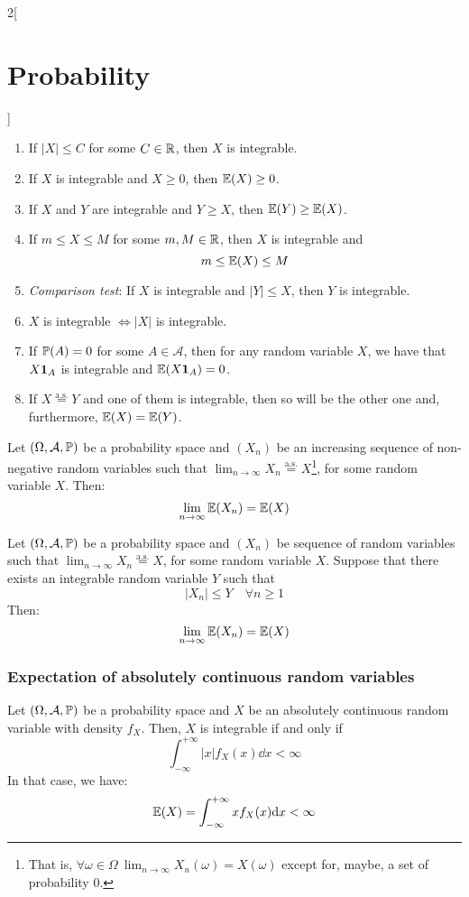 \documentclass[../../../main.tex]{subfiles}
\begin{document}
\begin{multicols}{2}[\section{Probability}]
\begin{prop}
\begin{enumerate}
      \item If $|X|\leq C$ for some $C\in \mathbb{R}$, then $X$ is integrable.
      \item If $X$ is integrable and $X\geq 0$, then $\mathbb{E}(X)\geq 0$.
      \item If $X$ and $Y$ are integrable and $Y\geq X$, then $\mathbb{E}(Y)\geq \mathbb{E}(X)$.
      \item If $m\leq X\leq M$ for some $m, M\in\mathbb{R}$, then $X$ is integrable and $$m\leq \mathbb{E}(X)\leq M$$
      \item \textit{Comparison test}: If $X$ is integrable and $|Y|\leq X$, then $Y$ is integrable.
      \item $X$ is integrable $\iff |X|$ is integrable.
      \item If $\mathbb{P}(A)=0$ for some $A\in\mathcal{A}$, then for any random variable $X$, we have that $X\boldsymbol{\mathrm{1}}_A$ is integrable and $\mathbb{E}(X\boldsymbol{\mathrm{1}}_A)=0$.
      \item If $X\overset{\text{a.s.}}{=}Y$ and one of them is integrable, then so will be the other one and, furthermore, $\mathbb{E}(X)=\mathbb{E}(Y)$.
    \end{enumerate}
  \end{prop}
  \begin{theorem}
    Let $(\Omega,\mathcal{A},\mathbb{P})$ be a probability space and $(X_n)$ be an increasing sequence of non-negative random variables such that $\displaystyle\lim_{n\to\infty}X_n\overset{\text{a.s.}}{=}X$\footnote{That is, $\displaystyle\forall\omega\in\Omega\ \lim_{n\to\infty}X_n(\omega)=X(\omega)$ except for, maybe, a set of probability 0.}, for some random variable $X$. Then: $$\lim_{n\to\infty} \mathbb{E}(X_n)=\mathbb{E}(X)$$
  \end{theorem}
  \begin{theorem}
    Let $(\Omega,\mathcal{A},\mathbb{P})$ be a probability space and $(X_n)$ be sequence of random variables such that $\displaystyle\lim_{n\to\infty}X_n\overset{\text{a.s.}}{=}X$, for some random variable $X$. Suppose that there exists an integrable random variable $Y$ such that $$|X_n|\leq Y\quad\forall n\geq 1$$ Then: $$\lim_{n\to\infty} \mathbb{E}(X_n)=\mathbb{E}(X)$$
  \end{theorem}
  \subsubsection{Expectation of absolutely continuous random variables}
  \begin{theorem}
    Let $(\Omega,\mathcal{A},\mathbb{P})$ be a probability space and $X$ be an absolutely continuous random variable with density $f_X$. Then, $X$ is integrable if and only if $$\int_{-\infty}^{+\infty}|x|f_X(x)\dd x<\infty$$
    In that case, we have: $$\mathbb{E}(X)=\int_{-\infty}^{+\infty}xf_X(x)\dd x<\infty$$
  \end{theorem}

\end{multicols}
\end{document}
